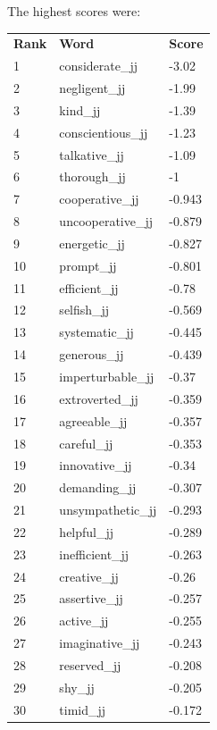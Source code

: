 \documentclass[10pt,letterpaper]{book}
\begin{document}
The highest scores were:
\begin{tabular}{ l l l }
        \textbf{Rank} & \textbf{Word} & \textbf{Score} \\
        1 & considerate\_jj & -3.02 \\
        2 & negligent\_jj & -1.99 \\
        3 & kind\_jj & -1.39 \\
        4 & conscientious\_jj & -1.23 \\
        5 & talkative\_jj & -1.09 \\
        6 & thorough\_jj & -1 \\
        7 & cooperative\_jj & -0.943 \\
        8 & uncooperative\_jj & -0.879 \\
        9 & energetic\_jj & -0.827 \\
        10 & prompt\_jj & -0.801 \\
        11 & efficient\_jj & -0.78 \\
        12 & selfish\_jj & -0.569 \\
        13 & systematic\_jj & -0.445 \\
        14 & generous\_jj & -0.439 \\
        15 & imperturbable\_jj & -0.37 \\
        16 & extroverted\_jj & -0.359 \\
        17 & agreeable\_jj & -0.357 \\
        18 & careful\_jj & -0.353 \\
        19 & innovative\_jj & -0.34 \\
        20 & demanding\_jj & -0.307 \\
        21 & unsympathetic\_jj & -0.293 \\
        22 & helpful\_jj & -0.289 \\
        23 & inefficient\_jj & -0.263 \\
        24 & creative\_jj & -0.26 \\
        25 & assertive\_jj & -0.257 \\
        26 & active\_jj & -0.255 \\
        27 & imaginative\_jj & -0.243 \\
        28 & reserved\_jj & -0.208 \\
        29 & shy\_jj & -0.205 \\
        30 & timid\_jj & -0.172 \\
\end{tabular}
\end{document}
